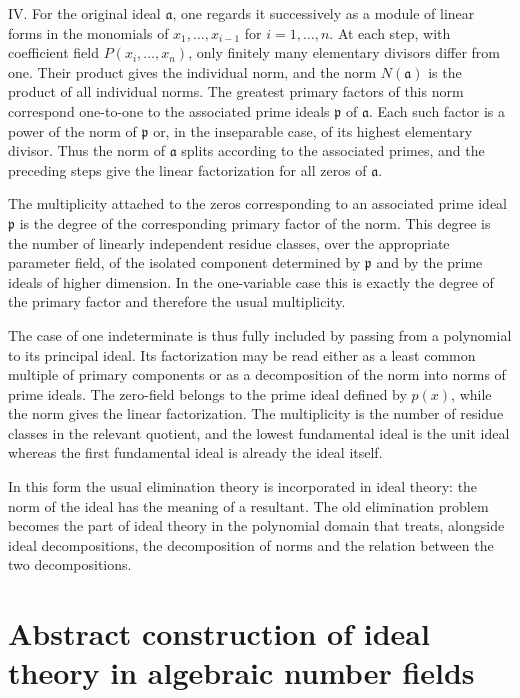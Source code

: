 \documentclass[11pt]{article}
\begin{document}
IV. For the original ideal $\mathfrak a$, one regards it successively as a module of linear forms in the monomials of $x_1,\ldots,x_{i-1}$ for $i=1,\ldots,n$. At each step, with coefficient field $P(x_i,
\ldots,x_n)$, only finitely many elementary divisors differ from one. Their product gives the individual norm, and the norm $N(\mathfrak a)$ is the product of all individual norms. The greatest primary factors of this norm correspond one-to-one to the associated prime ideals $\mathfrak p$ of $\mathfrak a$. Each such factor is a power of the norm of $\mathfrak p$ or, in the inseparable case, of its highest elementary divisor. Thus the norm of $\mathfrak a$ splits according to the associated primes, and the preceding steps give the linear factorization for all zeros of $\mathfrak a$.

The multiplicity attached to the zeros corresponding to an associated prime ideal $\mathfrak p$ is the degree of the corresponding primary factor of the norm. This degree is the number of linearly independent residue classes, over the appropriate parameter field, of the isolated component determined by $\mathfrak p$ and by the prime ideals of higher dimension. In the one-variable case this is exactly the degree of the primary factor and therefore the usual multiplicity.

The case of one indeterminate is thus fully included by passing from a polynomial to its principal ideal. Its factorization may be read either as a least common multiple of primary components or as a decomposition of the norm into norms of prime ideals. The zero-field belongs to the prime ideal defined by $p(x)$, while the norm gives the linear factorization. The multiplicity is the number of residue classes in the relevant quotient, and the lowest fundamental ideal is the unit ideal whereas the first fundamental ideal is already the ideal itself.

In this form the usual elimination theory is incorporated in ideal theory: the norm of the ideal has the meaning of a resultant. The old elimination problem becomes the part of ideal theory in the polynomial domain that treats, alongside ideal decompositions, the decomposition of norms and the relation between the two decompositions.

\newpage

\section{Abstract construction of ideal theory in algebraic number fields}
\end{document}
